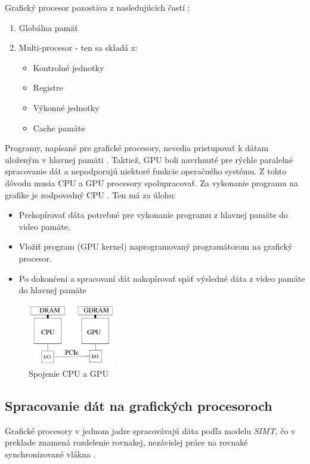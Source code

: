 \documentclass[conference]{IEEEtran}
\begin{document}
Grafický procesor pozostáva z nasledujúcich častí \cite{tatourian}:

\begin{enumerate}
	\item{Globálna pamäť}
	\item{Multi-procesor - ten sa skladá z:}
	\begin{itemize}
		\item{Kontrolné jednotky}
		\item{Registre}
		\item{Výkonné jednotky}
		\item{Cache pamäte}
	\end{itemize}
\end{enumerate}

Programy, napísané pre grafické procesory, nevedia pristupovať k dátam uloženým v hlavnej pamäti \cite{gpuRowe}. Taktiež, GPU boli navrhnuté pre rýchle paralelné spracovanie dát a nepodporujú niektoré funkcie operačného systému. Z tohto dôvodu musia CPU a GPU procesory spolupracovať. Za vykonanie programu na grafike je zodpovedný CPU \cite{tatourian}. Ten má za úlohu:

\begin{itemize}
	\item{Prekopírovať dáta potrebné pre vykonanie programu z hlavnej pamäte do video pamäte.}
	\item{Vložiť program (GPU kernel) naprogramovaný programátorom na grafický procesor.}
	\item{Po dokončení a spracovaní dát nakopírovať späť výsledné dáta z video pamäte do hlavnej pamäte}
\end{itemize}

\begin{figure}[!h]
\centering
\includegraphics[width=1.5in]{img/CPU+GPU}
\caption{Spojenie CPU a GPU}
\end{figure}

\subsection{Spracovanie dát na grafických procesoroch}

Grafické procesory v jednom jadre spracovávajú dáta podľa modelu \textit{SIMT}, čo v preklade znamená rozdelenie rovnakej, nezávislej  práce na rovnaké synchronizované vlákna \cite{gg}.
\end{document}
